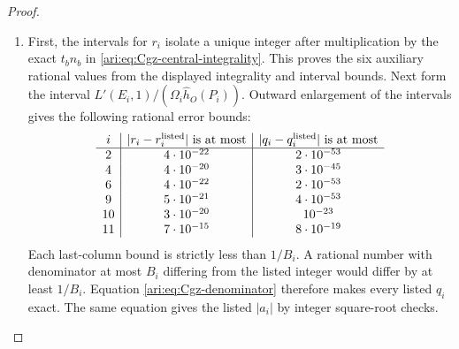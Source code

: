 \begin{proof}
\begin{enumerate}[label=\arabic*.,leftmargin=*]
\item First, the intervals for
$r_i$ isolate a unique integer after multiplication by the exact
$t_bn_b$ in \eqref{ari:eq:Cgz-central-integrality}. This proves the
six auxiliary rational values from the displayed integrality and interval bounds. Next form the
interval $L'(E_i,1)/(\Omega_i\widehat h_O(P_i))$. Outward enlargement of the intervals gives the following rational
error bounds:
\[
\begin{array}{c|c|c}
 i&|r_i-r_i^{\rm listed}|\text{ is at most}
   &|q_i-q_i^{\rm listed}|\text{ is at most}\\\hline
 2&4\cdot10^{-22}&2\cdot10^{-53}\\
 4&4\cdot10^{-20}&3\cdot10^{-45}\\
 6&4\cdot10^{-22}&2\cdot10^{-53}\\
 9&5\cdot10^{-21}&4\cdot10^{-53}\\
 10&3\cdot10^{-20}&10^{-23}\\
 11&7\cdot10^{-15}&8\cdot10^{-19}
\end{array}
\]
Each last-column bound is strictly less than $1/B_i$. A rational
number with denominator at most $B_i$ differing from the listed
integer would differ by at least $1/B_i$. Equation
\eqref{ari:eq:Cgz-denominator} therefore makes every listed $q_i$
exact. The same equation gives the listed $|a_i|$ by integer
square-root checks. 
\end{enumerate}
\end{proof}